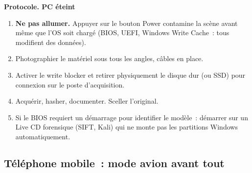 \begin{boxPNC}
\textbf{Protocole. PC éteint}

\begin{enumerate}
    \item \textbf{Ne pas allumer.} Appuyer sur le bouton Power contamine
          la scène avant même que l'OS soit chargé (BIOS, UEFI, Windows
          Write Cache~: tous modifient des données).
    \item Photographier le matériel sous tous les angles, câbles en place.
    \item Activer le write blocker et retirer physiquement le disque dur
          (ou SSD) pour connexion sur le poste d'acquisition.
    \item Acquérir, hasher, documenter. Sceller l'original.
    \item Si le BIOS requiert un démarrage pour identifier le modèle~:
          démarrer sur un Live CD forensique (SIFT, Kali) qui ne monte
          pas les partitions Windows automatiquement.
\end{enumerate}
\end{boxPNC}

\subsection{Téléphone mobile~: mode avion avant tout}

